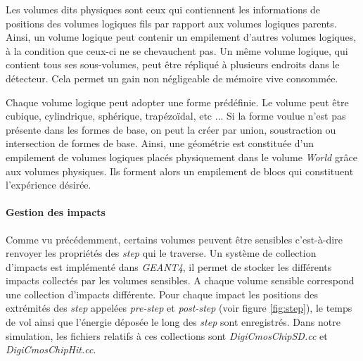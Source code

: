     \medskip
    
    Les volumes dits physiques sont ceux qui contiennent les informations de positions des volumes logiques fils par rapport aux volumes logiques parents. Ainsi, un volume logique peut contenir un empilement d'autres volumes logiques, \`a la condition que ceux-ci ne se chevauchent pas. Un m\^eme volume logique, qui contient tous ses sous-volumes, peut \^etre r\'epliqu\'e \`a plusieurs endroits dans le d\'etecteur. Cela permet un gain non n\'egligeable de m\'emoire vive consomm\'ee.
    
    \medskip
    
    Chaque volume logique peut adopter une forme pr\'ed\'efinie. Le volume peut être cubique, cylindrique, sph\'erique, trap\'ezo\"idal, etc ... Si la forme voulue n'est pas pr\'esente dans les formes de base, on peut la cr\'eer par union, soustraction ou intersection de formes de base. Ainsi, une g\'eom\'etrie est constitu\'ee d'un empilement de volumes logiques plac\'es physiquement dans le volume \textit{World} grâce aux volumes physiques. Ils forment alors un empilement de blocs qui constituent l'expérience d\'esir\'ee. 
    
    
    \paragraph{Gestion des impacts}

    Comme vu pr\'ec\'edemment, certains volumes peuvent \^etre sensibles c'est-\`a-dire renvoyer les propri\'et\'es des \textit{step} qui le traverse. Un syst\`eme de collection d'impacts est impl\'ement\'e dans \textit{GEANT4}, il permet de stocker les diff\'erents impacts collect\'es par les volumes sensibles. A chaque volume sensible correspond une collection d'impacts diff\'erente. Pour chaque impact les positions des extr\'emités des \textit{step} appel\'ees \textit{pre-step} et \textit{post-step} (voir figure \ref{fig:step}), le temps de vol ainsi que l'\'energie d\'eposée le long des \textit{step} sont enregistr\'es. Dans notre simulation, les fichiers relatifs \`a ces collections sont \textit{DigiCmosChipSD.cc} et \textit{DigiCmosChipHit.cc}.
    

